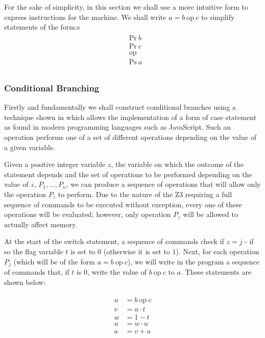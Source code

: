 \documentclass[Master.tex]{subfiles}
\begin{document}
For the sake of simplicity, in this section we shall use a more intuitive form to express instructions for the machine. We shall write $a = b\ \mathrm{op}\ c$ to simplify statements of the form:s
\begin{gather*}
\begin{aligned}
&\bm{\mathrm{Pr}}\ b\\
&\bm{\mathrm{Pr}}\ c\\
&\textrm{op}\\ 
&\bm{\mathrm{Ps}}\ a\\
\end{aligned}
\end{gather*}

\subsubsection{Conditional Branching}

Firstly and fundamentally we shall construct conditional branches using a technique shown in \cite{ibarra1983control} which allows the implementation of a form of case statement as found in modern programming languages such as JavaScript. Such an operation performs one of a set of different operations depending on the value of a given variable.

Given a positive integer variable $z$, the variable on which the outcome of the statement depends and the set of operations to be performed depending on the value of $z$, $P_1, ... , P_n$, we can produce a sequence of operations that will allow only the operation $P_z$ to perform. Due to the nature of the Z3 requiring a full sequence of commands to be executed without exception, every one of these operations will be evaluated; however, only operation $P_z$ will be allowed to actually affect memory.


At the start of the switch statement, a sequence of commands check if $z = j$ - if so the flag variable $t$ is set to $0$ (otherwise it is set to $1$). Next, for each operation $P_j$ (which will be of the form $a = b\ \mathrm{op}\ c$), we will write in the program a sequence of commands that, if $t$ is $0$, write the value of $b\ \mathrm{op}\ c$ to $a$. These statements are shown below:

\begin{gather*}
\begin{aligned}
u &= b\ \mathrm{op}\ c \\
v &= a \cdot t \\
w &= 1 - t \\
u &= w \cdot u \\
a &= v + u
\end{aligned}
\end{gather*}
\end{document}
